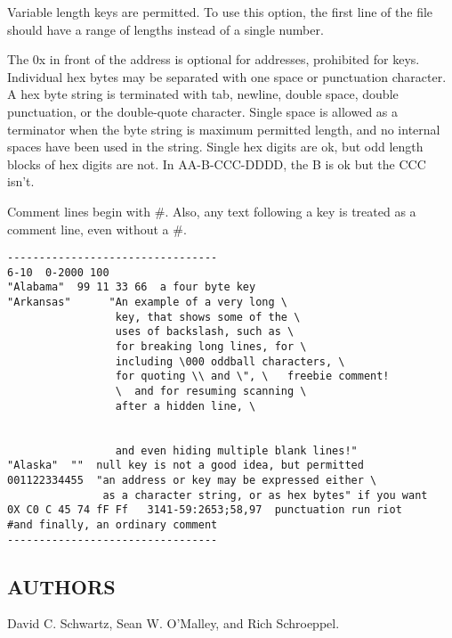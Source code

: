 Variable length keys are permitted.
To use this option, the first line of the file should have a range
of lengths instead of a single number.

The 0x in front of the address is optional for addresses, prohibited 
for keys.
Individual hex bytes may be separated with one space or punctuation
character.  A hex byte string is terminated with tab, newline,
double space, double punctuation, or the double-quote character.
Single space is allowed as a terminator when the byte string is
maximum permitted length, and no internal spaces have been used in 
the string.  Single hex digits are ok, but odd length blocks of
hex digits are not.  In AA-B-CCC-DDDD, the B is ok but the CCC isn't.

Comment lines begin with \#.  Also, any text following a key is treated as
a comment line, even without a \#.
\begin{verbatim}
---------------------------------
6-10  0-2000 100
"Alabama"  99 11 33 66  a four byte key
"Arkansas"      "An example of a very long \
                 key, that shows some of the \
                 uses of backslash, such as \
                 for breaking long lines, for \
                 including \000 oddball characters, \
                 for quoting \\ and \", \   freebie comment!
                 \  and for resuming scanning \
                 after a hidden line, \


                 and even hiding multiple blank lines!"
"Alaska"  ""  null key is not a good idea, but permitted
001122334455  "an address or key may be expressed either \
               as a character string, or as hex bytes" if you want
0X C0 C 45 74 fF Ff   3141-59:2653;58,97  punctuation run riot
#and finally, an ordinary comment
---------------------------------
\end{verbatim}

\medskip

\subsection*{AUTHORS}

\noindent David C. Schwartz, Sean W. O'Malley, and Rich Schroeppel.


